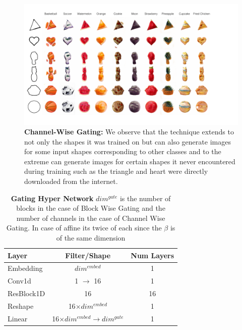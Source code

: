\begin{figure}[t]
    \centering
    \includegraphics[width=\linewidth,trim={0 0 4.5cm 0},clip]{paper_images/supplementary_grid_channel.pdf}
    \caption{{\bf Channel-Wise Gating:} We observe that the technique extends to not only the shapes it was trained on but can also generate images for some input shapes corresponding to other classes and to the extreme can generate images for certain shapes it never encountered during training such as the triangle and heart were directly downloaded from the internet. }
    \label{fig:channel_shapes}
    \vspace{-3mm}
\end{figure}


\begin{table}[ht]
\caption{\textbf{Gating Hyper Network} $dim^{gate}$ is the number of blocks in the case of Block Wise Gating and the number of channels in the case of Channel Wise Gating. In case of affine its twice of each since the $\beta$ is of the same dimension }
\centering %
\begin{tabular}{l c c} %
\toprule%
\textbf{Layer} & \textbf{Filter/Shape} & \textbf{Num Layers} \\
\midrule
Embedding & $dim^{embed}$ & 1 \\
Conv1d & 1 $\rightarrow$ 16 & 1\\
ResBlock1D & 16 & 16\\
Reshape & 16$\times dim^{embed}$ & 1\\
Linear & 16$\times dim^{embed} \rightarrow dim^{gate} $& 1\\
\bottomrule%
\end{tabular}
\label{table:resnet_gating} %
\end{table}


